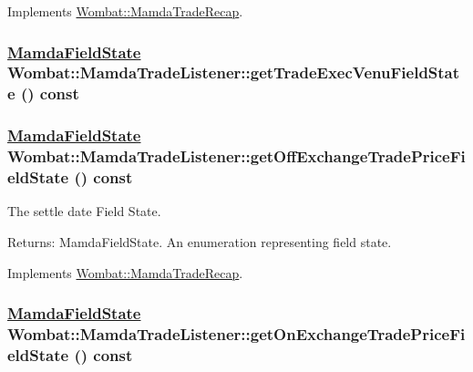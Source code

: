 Implements \hyperlink{classWombat_1_1MamdaTradeRecap_8f2dc16d498df59f741eb2eab59ca95a}{Wombat::Mamda\-Trade\-Recap}.\hypertarget{classWombat_1_1MamdaTradeListener_2a891807c470a26962835489ee1065c1}{
\subsubsection[getTradeExecVenuFieldState]{\setlength{\rightskip}{0pt plus 5cm}\hyperlink{namespaceWombat_93aac974f2ab713554fd12a1fa3b7d2a}{Mamda\-Field\-State} Wombat::Mamda\-Trade\-Listener::get\-Trade\-Exec\-Venu\-Field\-State () const}}
\label{classWombat_1_1MamdaTradeListener_2a891807c470a26962835489ee1065c1}


\hypertarget{classWombat_1_1MamdaTradeListener_7939de727c94506247b065996e9ef1b5}{
\subsubsection[getOffExchangeTradePriceFieldState]{\setlength{\rightskip}{0pt plus 5cm}\hyperlink{namespaceWombat_93aac974f2ab713554fd12a1fa3b7d2a}{Mamda\-Field\-State} Wombat::Mamda\-Trade\-Listener::get\-Off\-Exchange\-Trade\-Price\-Field\-State () const}}
\label{classWombat_1_1MamdaTradeListener_7939de727c94506247b065996e9ef1b5}


The settle date Field State. 

\begin{Desc}
\item[Returns:]Mamda\-Field\-State. An enumeration representing field state. \end{Desc}


Implements \hyperlink{classWombat_1_1MamdaTradeRecap_da82568c7dabc3507fe6a3a8b27324c0}{Wombat::Mamda\-Trade\-Recap}.\hypertarget{classWombat_1_1MamdaTradeListener_d197007dd685e6240a89ad4729c62352}{
\subsubsection[getOnExchangeTradePriceFieldState]{\setlength{\rightskip}{0pt plus 5cm}\hyperlink{namespaceWombat_93aac974f2ab713554fd12a1fa3b7d2a}{Mamda\-Field\-State} Wombat::Mamda\-Trade\-Listener::get\-On\-Exchange\-Trade\-Price\-Field\-State () const}}
\label{classWombat_1_1MamdaTradeListener_d197007dd685e6240a89ad4729c62352}


